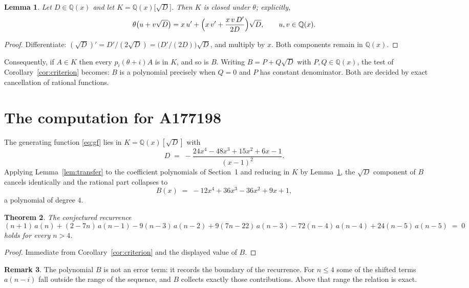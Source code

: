 \documentclass[11pt,a4paper]{article}
\theoremstyle{plain}
\newtheorem{theorem}{Theorem}
\newtheorem{lemma}[theorem]{Lemma}
\theoremstyle{definition}
\newtheorem{remark}[theorem]{Remark}
\begin{document}
\begin{lemma}\label{lem:field}
Let $D\in\mathbb{Q}(x)$ and let $K=\mathbb{Q}(x)\bigl[\sqrt{D}\bigr]$. Then $K$ is closed
under $\theta$; explicitly,
\[
\theta\bigl(u+v\sqrt{D}\bigr)=x\,u'+\Bigl(x\,v'+\frac{x\,v\,D'}{2D}\Bigr)\sqrt{D},
\qquad u,v\in\mathbb{Q}(x).
\]
\end{lemma}

\begin{proof}
Differentiate: $(\sqrt{D})'=D'/(2\sqrt{D})=\bigl(D'/(2D)\bigr)\sqrt{D}$, and multiply by
$x$. Both components remain in $\mathbb{Q}(x)$.
\end{proof}

Consequently, if $A\in K$ then every $p_{i}(\theta+i)A$ is in $K$, and so is $B$. Writing
$B=P+Q\sqrt{D}$ with $P,Q\in\mathbb{Q}(x)$, the test of Corollary~\ref{cor:criterion}
becomes: $B$ is a polynomial precisely when $Q=0$ and $P$ has constant denominator. Both
are decided by exact cancellation of rational functions.

\section{The computation for A177198}

The generating function \eqref{eq:gf} lies in $K=\mathbb{Q}(x)[\sqrt{D}]$ with
\[
D \;=\; - \frac{24 x^{4} - 48 x^{3} + 15 x^{2} + 6 x - 1}{\left(x - 1\right)^{2}} .
\]
Applying Lemma~\ref{lem:transfer} to the coefficient polynomials of Section~1 and reducing
in $K$ by Lemma~\ref{lem:field}, the $\sqrt{D}$ component of $B$ cancels identically and
the rational part collapses to
\[
B(x)\;=\;- 12 x^{4} + 36 x^{3} - 36 x^{2} + 9 x + 1 ,
\]
a polynomial of degree $4$.

\begin{theorem}
The conjectured recurrence
\[
(n + 1)\,a(n) + (2 - 7 n)\,a(n-1) -  9 \left(n - 3\right)\,a(n-2) + 9 \left(7 n - 22\right)\,a(n-3) -  72 \left(n - 4\right)\,a(n-4) + 24 \left(n - 5\right)\,a(n-5) \;=\;0
\]
holds for every $n>4$.
\end{theorem}

\begin{proof}
Immediate from Corollary~\ref{cor:criterion} and the displayed value of $B$.
\end{proof}

\begin{remark}
The polynomial $B$ is not an error term: it records the boundary of the recurrence. For
$n\le4$ some of the shifted terms $a(n-i)$ fall outside the range of the sequence,
and $B$ collects exactly those contributions. Above that range the relation is exact.
\end{remark}
\end{document}
